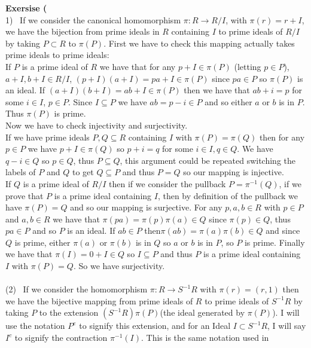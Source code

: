 \documentclass[12pt]{article}
\newenvironment{ques}[1]{\textbf{Exersise #1}\vspace{1 mm}\\ }{\bigskip}
\theoremstyle{definition}
\begin{document}
\begin{ques}{3.4}
	(1) \ If we consider the canonical homomorphism $\pi: R \to R/I$, with
	$\pi(r) = r + I$, we have the
	bijection from prime ideals in $R$ containing $I$ to prime ideals of $R/I$
	by taking $P \subset R$ to $\pi(P)$. First we have to check this mapping
	actually takes prime ideals to prime ideals:\\
	If $P$ is a prime ideal of $R$ we have that for any $p + I \in \pi(P)$
	(letting $p \in P$), $a + I, b + I \in R/I$, $(p + I)(a + I) = pa + I \in
	\pi(P)$ since $pa \in P$ so $\pi(P)$ is an ideal. If $(a + I)(b + I) = ab + I \in
	\pi(P)$ then we have that $ab + i = p$ for some $i \in I$, $p \in P$. Since
	$I \subseteq P$ we have $ab = p - i \in P$ and so either $a$ or $b$ is in
	$P$. Thus $\pi(P)$ is prime. \\
	Now we have to check injectivity and surjectivity.\\
	If we have prime ideals $P, Q \subseteq R$ containing $I$ with $\pi(P) =
	\pi(Q)$ then for any $p \in P$ we have $p + I \in \pi(Q)$ so $p + i = q$
	for some $i \in I, q \in Q$. We have $q - i \in Q$ so $p \in Q$, thus $P
	\subseteq Q$, this argument could be repeated switching the labels of $P$
	and $Q$ to get $Q \subseteq P$ and thus $P = Q$ so our mapping is
	injective. \\
	If $Q$ is a prime ideal of $R/I$ then if we consider the pullback $P =
	\pi^{-1}(Q)$, if we prove that $P$ is a prime ideal containing $I$, then by
	definition of the pullback we have $\pi(P) = Q$ and so our mapping is
	surjective. For any $p, a, b \in R$ with $p \in P$ and $a, b \in R$ we have
	that $\pi(pa) = \pi(p)\pi(a) \in Q$ since $\pi(p) \in Q$, thus $pa \in P$
	and so $P$ is an ideal. If $ab \in P$ then$\pi(ab) =  \pi(a)\pi(b) \in Q$
	and since $Q$ is prime, either $\pi(a)$ or $\pi(b)$ is in $Q$ so $a$ or $b$
	is in $P$, so $P$ is prime. Finally we have that $\pi(I) = 0 + I \in Q$ so
	$I \subseteq P$ and thus $P$ is a prime ideal containing $I$ with $\pi(P)=
	Q$. So we have surjectivity.\\
	\\
	(2) \ If we consider the homomorphism $\pi: R \to S^{-1}R$ with $\pi(r) =
	(r,1)$ then we have the bijective mapping from prime ideals of $R$ to prime
	ideals of $S^{-1}R$ by taking $P$ to the extension $(S^{-1}R)\pi(P)$(the
	ideal generated by $\pi(P)$). I will use the notation $P^e$ to signify this
	extension, and for an Ideal $I \subset S^{-1}R$, I will say $I^c$ to
	signify the contraction $\pi^{-1}(I)$. This is the same notation used in

\end{ques}
\end{document}

